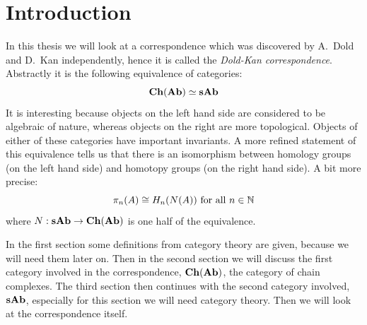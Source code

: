 \documentclass[titlepage, 11pt]{amsproc}
\theoremstyle{plain}
\theoremstyle{definition}
\begin{document}
\section*{Introduction}
In this thesis we will look at a correspondence which was discovered by A.~Dold \cite{dold} and D.~Kan \cite{kan} independently, hence it is called the \emph{Dold-Kan correspondence}. Abstractly it is the following equivalence of categories:
$$ \mathbf{Ch}(\mathbf{Ab}) \simeq \mathbf{sAb} $$
It is interesting because objects on the left hand side are considered to be algebraic of nature, whereas objects on the right are more topological. Objects of either of these categories have important invariants. A more refined statement of this equivalence tells us that there is an isomorphism between homology groups (on the left hand side) and homotopy groups (on the right hand side). A bit more precise:
$$ \pi_n(A) \cong H_n(N(A)) \text{ for all } n \in \mathbb{N} $$
where $N: \mathbf{sAb} \to \mathbf{Ch}(\mathbf{Ab})$ is one half of the equivalence.

In the first section some definitions from category theory are given, because we will need them later on. Then in the second section we will discuss the first category involved in the correspondence, $\mathbf{Ch}(\mathbf{Ab})$, the category of chain complexes. The third section then continues with the second category involved, $\mathbf{sAb}$, especially for this section we will need category theory. Then we will look at the correspondence itself.

\newpage


\newpage


\newpage


\newpage


\newpage


\newpage
\listoftodos

\nocite{*}

	
\end{document}

